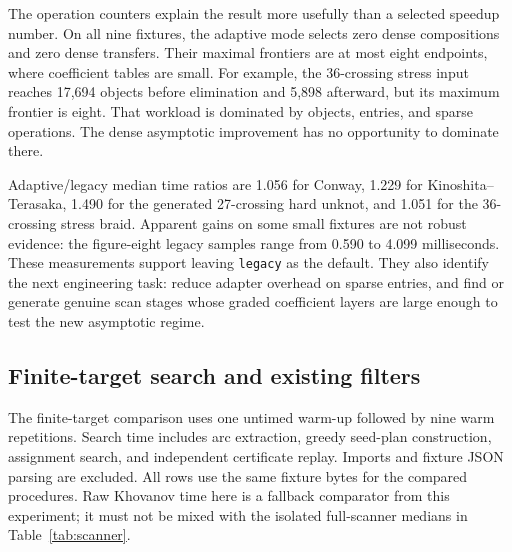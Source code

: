 \begin{table}[htbp]
\centering\small

\caption{Complete scanner medians in milliseconds. Every one of the
135 runs agrees on total rank and the complete homological degree
distribution. These timings use a different, isolated-process protocol
from Table~\ref{tab:quotient}.}
\label{tab:scanner}
\end{table}

The operation counters explain the result more usefully than a selected
speedup number. On all nine fixtures, the adaptive mode selects zero
dense compositions and zero dense transfers. Their maximal frontiers
are at most eight endpoints, where coefficient tables are small. For
example, the 36-crossing stress input reaches 17,694 objects before
elimination and 5,898 afterward, but its maximum frontier is eight.
That workload is dominated by objects, entries, and sparse operations.
The dense asymptotic improvement has no opportunity to dominate there.

Adaptive/legacy median time ratios are 1.056 for Conway, 1.229 for
Kinoshita--Terasaka, 1.490 for the generated 27-crossing hard unknot, and
1.051 for the 36-crossing stress braid. Apparent gains on some small
fixtures are not robust evidence: the figure-eight legacy samples range
from 0.590 to 4.099 milliseconds. These measurements support leaving
\texttt{legacy} as the default. They also identify the next engineering
task: reduce adapter overhead on sparse entries, and find or generate
genuine scan stages whose graded coefficient layers are large enough to
test the new asymptotic regime.

\subsection{Finite-target search and existing filters}

The finite-target comparison uses one untimed warm-up followed by nine
warm repetitions. Search time includes arc extraction, greedy seed-plan
construction, assignment search, and independent certificate replay.
Imports and fixture JSON parsing are excluded. All rows use the same
fixture bytes for the compared procedures. Raw Khovanov time here is a
fallback comparator from this experiment; it must not be mixed with
the isolated full-scanner medians in Table~\ref{tab:scanner}.

\begin{table}[htbp]
\centering\small

\caption{Warm median milliseconds. $b$ is the discovered seed count and
$a$ the number of complete seed-orbit assignments tried. $\dagger$ marks
an inconclusive $A_5$ search, which has not decided the unknot.
An em dash means that comparator was not measured.}
\label{tab:quotient}
\end{table}

